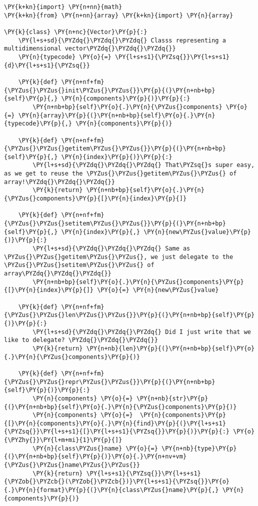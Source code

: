 \begin{Verbatim}[label=\makebox{\url{https://bitbucket.org/lbaldini/programming/src/tip/snippets/vector\_random\_access.py}},commandchars=\\\{\}]
\PY{k+kn}{import} \PY{n+nn}{math}
\PY{k+kn}{from} \PY{n+nn}{array} \PY{k+kn}{import} \PY{n}{array}

\PY{k}{class} \PY{n+nc}{Vector}\PY{p}{:}
    \PY{l+s+sd}{\PYZdq{}\PYZdq{}\PYZdq{} Classs representing a multidimensional vector\PYZdq{}\PYZdq{}\PYZdq{}}    
    \PY{n}{typecode} \PY{o}{=} \PY{l+s+s1}{\PYZsq{}}\PY{l+s+s1}{d}\PY{l+s+s1}{\PYZsq{}}
    
    \PY{k}{def} \PY{n+nf+fm}{\PYZus{}\PYZus{}init\PYZus{}\PYZus{}}\PY{p}{(}\PY{n+nb+bp}{self}\PY{p}{,} \PY{n}{components}\PY{p}{)}\PY{p}{:}
        \PY{n+nb+bp}{self}\PY{o}{.}\PY{n}{\PYZus{}components} \PY{o}{=} \PY{n}{array}\PY{p}{(}\PY{n+nb+bp}{self}\PY{o}{.}\PY{n}{typecode}\PY{p}{,} \PY{n}{components}\PY{p}{)}
        
    \PY{k}{def} \PY{n+nf+fm}{\PYZus{}\PYZus{}getitem\PYZus{}\PYZus{}}\PY{p}{(}\PY{n+nb+bp}{self}\PY{p}{,} \PY{n}{index}\PY{p}{)}\PY{p}{:}
        \PY{l+s+sd}{\PYZdq{}\PYZdq{}\PYZdq{} That\PYZsq{}s super easy, as we get to reuse the \PYZus{}\PYZus{}getitem\PYZus{}\PYZus{} of array!\PYZdq{}\PYZdq{}\PYZdq{}}
        \PY{k}{return} \PY{n+nb+bp}{self}\PY{o}{.}\PY{n}{\PYZus{}components}\PY{p}{[}\PY{n}{index}\PY{p}{]}
    
    \PY{k}{def} \PY{n+nf+fm}{\PYZus{}\PYZus{}setitem\PYZus{}\PYZus{}}\PY{p}{(}\PY{n+nb+bp}{self}\PY{p}{,} \PY{n}{index}\PY{p}{,} \PY{n}{new\PYZus{}value}\PY{p}{)}\PY{p}{:}
        \PY{l+s+sd}{\PYZdq{}\PYZdq{}\PYZdq{} Same as \PYZus{}\PYZus{}getitem\PYZus{}\PYZus{}, we just delegate to the \PYZus{}\PYZus{}setitem\PYZus{}\PYZus{} of array\PYZdq{}\PYZdq{}\PYZdq{}}
        \PY{n+nb+bp}{self}\PY{o}{.}\PY{n}{\PYZus{}components}\PY{p}{[}\PY{n}{index}\PY{p}{]} \PY{o}{=} \PY{n}{new\PYZus{}value}
    
    \PY{k}{def} \PY{n+nf+fm}{\PYZus{}\PYZus{}len\PYZus{}\PYZus{}}\PY{p}{(}\PY{n+nb+bp}{self}\PY{p}{)}\PY{p}{:}
        \PY{l+s+sd}{\PYZdq{}\PYZdq{}\PYZdq{} Did I just write that we like to delegate? \PYZdq{}\PYZdq{}\PYZdq{}}
        \PY{k}{return} \PY{n+nb}{len}\PY{p}{(}\PY{n+nb+bp}{self}\PY{o}{.}\PY{n}{\PYZus{}components}\PY{p}{)}
    
    \PY{k}{def} \PY{n+nf+fm}{\PYZus{}\PYZus{}repr\PYZus{}\PYZus{}}\PY{p}{(}\PY{n+nb+bp}{self}\PY{p}{)}\PY{p}{:}
        \PY{n}{components} \PY{o}{=} \PY{n+nb}{str}\PY{p}{(}\PY{n+nb+bp}{self}\PY{o}{.}\PY{n}{\PYZus{}components}\PY{p}{)}
        \PY{n}{components} \PY{o}{=}  \PY{n}{components}\PY{p}{[}\PY{n}{components}\PY{o}{.}\PY{n}{find}\PY{p}{(}\PY{l+s+s1}{\PYZsq{}}\PY{l+s+s1}{[}\PY{l+s+s1}{\PYZsq{}}\PY{p}{)}\PY{p}{:} \PY{o}{\PYZhy{}}\PY{l+m+mi}{1}\PY{p}{]}
        \PY{n}{class\PYZus{}name} \PY{o}{=} \PY{n+nb}{type}\PY{p}{(}\PY{n+nb+bp}{self}\PY{p}{)}\PY{o}{.}\PY{n+nv+vm}{\PYZus{}\PYZus{}name\PYZus{}\PYZus{}}
        \PY{k}{return} \PY{l+s+s1}{\PYZsq{}}\PY{l+s+s1}{\PYZob{}\PYZcb{}(\PYZob{}\PYZcb{})}\PY{l+s+s1}{\PYZsq{}}\PY{o}{.}\PY{n}{format}\PY{p}{(}\PY{n}{class\PYZus{}name}\PY{p}{,} \PY{n}{components}\PY{p}{)}
\end{Verbatim}